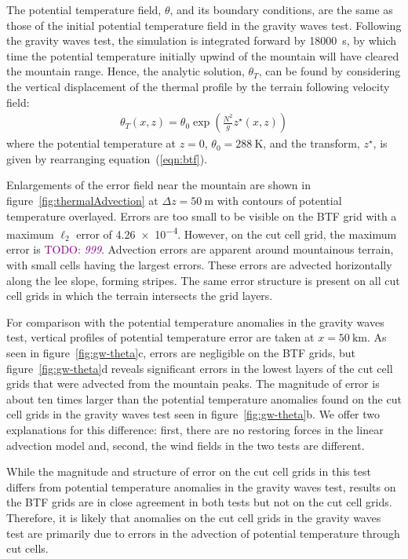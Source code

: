 \documentclass{ametsoc}
\newcommand{\TODO}[1]{\textcolor{purple}{TODO: \emph{#1}}}
\begin{document}
The potential temperature field, \(\theta\), and its boundary conditions, are the same as those of the initial potential temperature field in the gravity waves test.
Following the gravity waves test, the simulation is integrated forward by \SI{18000}{\second}, by which time the potential temperature initially upwind of the mountain will have cleared the mountain range.
Hence, the analytic solution, $\theta_T$, can be found by considering the vertical displacement of the thermal profile by the terrain following velocity field:
\begin{align}
	\theta_T(x, z) = \theta_0 \exp \left( \frac{N^2}{g} z^\star(x, z) \right) 
\end{align}
where the potential temperature at $z = 0$, $\theta_0 = \SI{288}{\kelvin}$, and the transform, $z^\star$, is given by rearranging equation~(\ref{eqn:btf}).

Enlargements of the error field near the mountain are shown in figure~\ref{fig:thermalAdvection} at $\Delta z = \SI{50}{\meter}$ with contours of potential temperature overlayed.  Errors are too small to be visible on the BTF grid with a maximum $\ell_2$ error of \num{4.26e-4}.
However, on the cut cell grid, the maximum error is \TODO{\num{999}}.  Advection errors are apparent around mountainous terrain, with small cells having the largest errors.  These errors are advected horizontally along the lee slope, forming stripes.
The same error structure is present on all cut cell grids in which the terrain intersects the grid layers.

For comparison with the potential temperature anomalies in the gravity waves test, vertical profiles of potential temperature error are taken at $x = \SI{50}{\kilo\meter}$.  As seen in figure~\ref{fig:gw-theta}c, errors are negligible on the BTF grids, but figure~\ref{fig:gw-theta}d reveals significant errors in the lowest layers of the cut cell grids that were advected from the mountain peaks.  The magnitude of error is about ten times larger than the potential temperature anomalies found on the cut cell grids in the gravity waves test seen in figure~\ref{fig:gw-theta}b.  We offer two explanations for this difference: first, there are no restoring forces in the linear advection model and, second, the wind fields in the two tests are different.

While the magnitude and structure of error on the cut cell grids in this test differs from potential temperature anomalies in the gravity waves test, results on the BTF grids are in close agreement in both tests but not on the cut cell grids.  Therefore, it is likely that anomalies on the cut cell grids in the gravity waves test are primarily due to errors in the advection of potential temperature through cut cells.
\end{document}
